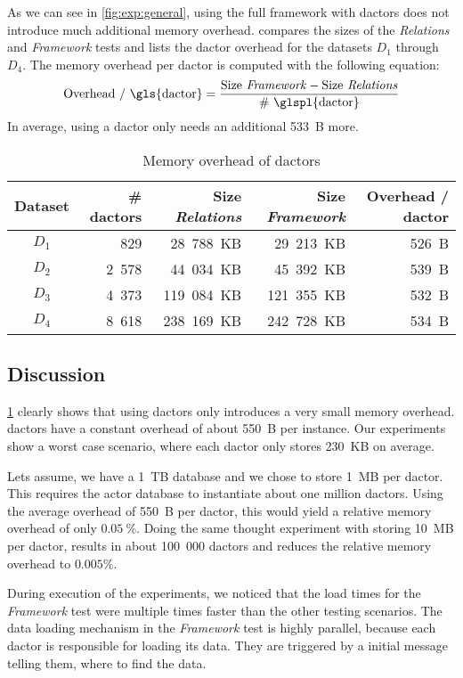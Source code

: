   As we can see in \cref{fig:exp:general}, using the full framework with \glspl{dactor} does not introduce much additional memory overhead.
   compares the sizes of the \textit{Relations} and \textit{Framework} tests and lists the \gls{dactor} overhead for the datasets $D_1$ through $D_4$.
  The memory overhead per \gls{dactor} is computed with the following equation:
  \begin{equation}
    \text{Overhead / \gls{dactor}} = \frac{\text{Size \textit{Framework}} - \text{Size \textit{Relations}}}{\text{\# \glspl{dactor}}}
  \end{equation}
  In average, using a \gls{dactor} only needs an additional 533~B more.

  \begin{table}
    \centering
    \begin{tabular}{crrrr}
      \toprule
      \textbf{Dataset} & \textbf{\# \glspl{dactor}} & \textbf{Size \textit{Relations}} & \textbf{Size \textit{Framework}} & \textbf{Overhead / \gls{dactor}}\\
      \midrule
      $D_1$ & 829 & 28~788~KB & 29~213~KB & 526~B \\
      $D_2$ & 2~578 & 44~034~KB & 45~392~KB & 539~B \\
      $D_3$ & 4~373 & 119~084~KB & 121~355~KB & 532~B \\
      $D_4$ & 8~618 & 238~169~KB & 242~728~KB & 534~B \\
      \bottomrule
    \end{tabular}
    \caption{Memory overhead of \glspl{dactor}}
    \label{tab:memory_overhead}
  \end{table}


\subsection{Discussion}\label{sec:exp:discussion}

  \cref{tab:memory_overhead} clearly shows that using \glspl{dactor} only introduces a very small memory overhead.
  \Glspl{dactor} have a constant overhead of about 550~B per instance.
  Our experiments show a worst case scenario, where each \gls{dactor} only stores 230~KB on average.
  
  Lets assume, we have a 1~TB database and we chose to store 1~MB per \gls{dactor}.
  This requires the actor database to instantiate about one million \glspl{dactor}.
  Using the average overhead of 550~B per \gls{dactor}, this would yield a relative memory overhead of only $0.05~\%$.
  Doing the same thought experiment with storing 10~MB per \gls{dactor}, results in about 100~000 \glspl{dactor} and reduces the relative memory overhead to $0.005 \%$.

  During execution of the experiments, we noticed that the load times for the \textit{Framework} test were multiple times faster than the other testing scenarios.
  The data loading mechanism in the \textit{Framework} test is highly parallel, because each \gls{dactor} is responsible for loading its data.
  They are triggered by a initial message telling them, where to find the data.
